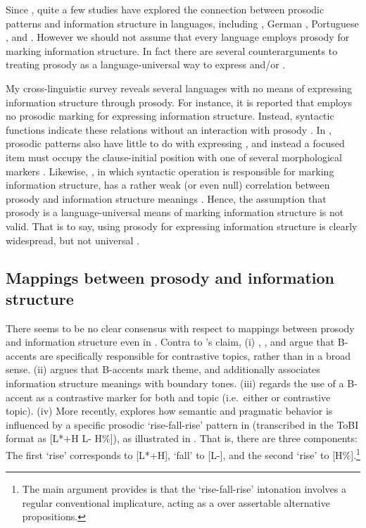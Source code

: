 Since \citet{jackendoff:72}, quite a few studies have explored the
connection between prosodic patterns and information structure in
languages, including  \citep{steedman:00}, German
\citep{buring:03}, Portuguese \citep{frota:00},  and
 \citep{ueyama:jun:98}.  However we should not assume that
every language employs prosody for marking information structure.  In
fact there are several counterarguments to treating prosody as a
language-universal way to express  and/or .



My cross-linguistic survey reveals several languages with no means of
expressing information structure through prosody.  For instance, it is
reported that  employs no prosodic marking for
expressing information structure.  Instead, syntactic functions
indicate these relations without an interaction with prosody
\citep{kugler:etal:07}.  In , prosodic patterns also have
little to do with expressing , and instead a focused item must
occupy the clause-initial position with one of several morphological
markers \citep{drubig:03}. Likewise, ,
in which syntactic operation is responsible for marking information
structure, has a rather weak (or even null) correlation between
prosody and information structure meanings
\citep{engdahl:vallduvi:96}. Hence, the assumption that
prosody is a language-universal means of marking information structure
is not valid.  That is to say, using prosody for expressing
information structure is clearly widespread, but not universal
\citep{drellishak:09}.


\subsection{Mappings between prosody and information structure}
\label{4:ssec:conditions}


There seems to be no clear consensus with respect to mappings between
prosody and information structure even in . Contra to
\citeauthor{jackendoff:72}'s claim, (i) \citet{kadmon:01},
\citet{buring:03}, and \citet{oshima:08} argue that B-accents are
specifically responsible for contrastive topics,
rather than  in a broad sense.
(ii) \citet{steedman:00} argues that B-accents mark
theme, and additionally associates information structure meanings with
boundary tones.  (iii) \citet{hedberg:06} regards the use of a
B-accent as a contrastive marker for both  and topic
(i.e.\ either  or contrastive topic). (iv) More
recently, \citet{constant:12} explores how semantic and pragmatic
behavior is influenced by a specific prosodic `rise-fall-rise' pattern
in  (transcribed in the ToBI format as [L*+H L- H\%]), as
illustrated in . That is, there are three
components: The first `rise' corresponds to [L*+H], `fall' to [L-],
and the second `rise' to [H\%].\footnote{The main argument
  \citet{constant:12} provides is that the `rise-fall-rise' intonation
  involves a regular conventional implicature, acting as a   over assertable alternative
  propositions.}

